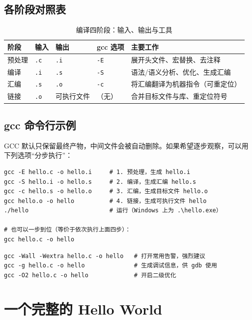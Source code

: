 \subsection{各阶段对照表}

\begin{table}[H]
\centering
\caption{编译四阶段：输入、输出与工具}
\label{tab:compile_stages}
\begin{tabularx}{\textwidth}{@{}l l l l X@{}}
\toprule
\textbf{阶段} & \textbf{输入} & \textbf{输出} & \textbf{gcc 选项} & \textbf{主要工作} \\
\midrule
预处理 & \texttt{.c} & \texttt{.i} & \texttt{-E} & 展开头文件、宏替换、去注释 \\
编译   & \texttt{.i} & \texttt{.s} & \texttt{-S} & 语法/语义分析、优化、生成汇编 \\
汇编   & \texttt{.s} & \texttt{.o} & \texttt{-c} & 将汇编翻译为机器指令（可重定位） \\
链接   & \texttt{.o} & 可执行文件 & （无） & 合并目标文件与库、重定位符号 \\
\bottomrule
\end{tabularx}
\end{table}

\subsection{gcc 命令行示例}

GCC 默认只保留最终产物，中间文件会被自动删除。如果希望逐步观察，可以用下列选项“分步执行”：

\begin{lstlisting}[caption={分步编译命令}]
gcc -E hello.c -o hello.i     # 1. 预处理，生成 hello.i
gcc -S hello.i -o hello.s     # 2. 编译，生成汇编 hello.s
gcc -c hello.s -o hello.o     # 3. 汇编，生成目标文件 hello.o
gcc hello.o -o hello          # 4. 链接，生成可执行文件 hello
./hello                       # 运行（Windows 上为 .\hello.exe）

# 也可以一步到位（等价于依次执行上面四步）：
gcc hello.c -o hello
\end{lstlisting}

\begin{lstlisting}[caption={常用的调试与告警选项}]
gcc -Wall -Wextra hello.c -o hello   # 打开常用告警，强烈建议
gcc -g hello.c -o hello              # 生成调试信息，供 gdb 使用
gcc -O2 hello.c -o hello             # 开启二级优化
\end{lstlisting}

\section{一个完整的 Hello World}

